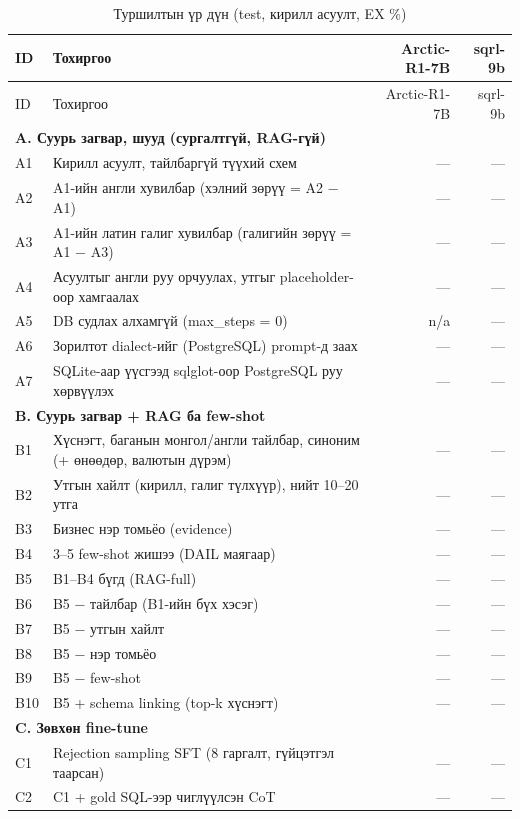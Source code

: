 \begin{small}
\begin{longtable}{p{1.0cm}p{7.6cm}rr}
\caption{Туршилтын үр дүн (test, кирилл асуулт, EX \%)}\label{tab:results-test}\\
\toprule ID & Тохиргоо & Arctic-R1-7B & sqrl-9b \\\midrule\endfirsthead
\toprule ID & Тохиргоо & Arctic-R1-7B & sqrl-9b \\\midrule\endhead
\multicolumn{4}{l}{\textbf{A. Суурь загвар, шууд (сургалтгүй, RAG-гүй)}}\\
A1 & Кирилл асуулт, тайлбаргүй түүхий схем & — & — \\
A2 & A1-ийн англи хувилбар (хэлний зөрүү = A2 − A1) & — & — \\
A3 & A1-ийн латин галиг хувилбар (галигийн зөрүү = A1 − A3) & — & — \\
A4 & Асуултыг англи руу орчуулах, утгыг placeholder-оор хамгаалах & — & — \\
A5 & DB судлах алхамгүй (max\_steps = 0) & n/a & — \\
A6 & Зорилтот dialect-ийг (PostgreSQL) prompt-д заах & — & — \\
A7 & SQLite-аар үүсгээд sqlglot-оор PostgreSQL руу хөрвүүлэх & — & — \\
\multicolumn{4}{l}{\textbf{B. Суурь загвар + RAG ба few-shot}}\\
B1 & Хүснэгт, баганын монгол/англи тайлбар, синоним (+ өнөөдөр, валютын дүрэм) & — & — \\
B2 & Утгын хайлт (кирилл, галиг түлхүүр), нийт 10–20 утга & — & — \\
B3 & Бизнес нэр томьёо (evidence) & — & — \\
B4 & 3–5 few-shot жишээ (DAIL маягаар) & — & — \\
B5 & B1–B4 бүгд (RAG-full) & — & — \\
B6 & B5 − тайлбар (B1-ийн бүх хэсэг) & — & — \\
B7 & B5 − утгын хайлт & — & — \\
B8 & B5 − нэр томьёо & — & — \\
B9 & B5 − few-shot & — & — \\
B10 & B5 + schema linking (top-k хүснэгт) & — & — \\
\multicolumn{4}{l}{\textbf{C. Зөвхөн fine-tune}}\\
C1 & Rejection sampling SFT (8 гаргалт, гүйцэтгэл таарсан) & — & — \\
C2 & C1 + gold SQL-ээр чиглүүлсэн CoT & — & — \\

\end{longtable}
\end{small}
